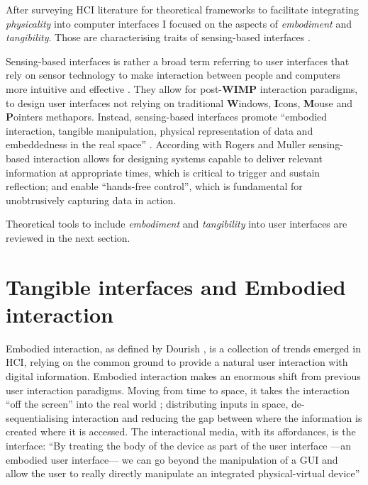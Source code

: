 After surveying HCI literature for theoretical frameworks to facilitate integrating \emph{physicality} into computer interfaces I focused on the aspects of \emph{embodiment} and \emph{tangibility}. Those are characterising traits of sensing-based interfaces \autocite{Benford:2005bo}.

Sensing-based interfaces is rather a broad term referring to user interfaces that rely on sensor technology to make interaction between people and computers more intuitive and effective \autocite{Zhai:2005jm}. They allow for post-\textbf{WIMP} \autocite{VanDam:1997tz} interaction paradigms, to design user interfaces not relying on traditional \textbf{W}indows, \textbf{I}cons, \textbf{M}ouse and \textbf{P}ointers methapors. Instead, sensing-based interfaces promote ``embodied interaction, tangible manipulation, physical representation of data and embeddedness in the real space'' \autocite{Hornecker:2006uq}. According with Rogers and Muller \autocite*{Rogers:2006te} sensing-based interaction allows for designing systems capable to deliver relevant information at appropriate times, which is critical to trigger and sustain reflection; and enable ``hands-free control'', which is fundamental for unobtrusively capturing data in action.

Theoretical tools to include \emph{embodiment} and \emph{tangibility} into user interfaces are reviewed in the next section.

\section{Tangible interfaces and Embodied interaction}\label{tangible-interfaces-and-embodied-interaction}

Embodied interaction, as defined by Dourish \autocite{Dourish:2001vc}, is a collection of trends emerged in HCI, relying on the common ground to provide a natural user interaction with digital information. Embodied interaction makes an enormous shift from previous user interaction paradigms. Moving from time to space, it takes the interaction ``off the screen'' into the real world \autocite{Dourish:2001vc}; distributing inputs in space, de-sequentialising interaction and reducing the gap between where the information is created where it is accessed. The interactional media, with its affordances, is the interface: ``By treating the body of the device as part of the user interface ---an embodied user interface--- we can go beyond the manipulation of a GUI and allow the user to really directly manipulate an integrated physical-virtual device'' \autocite{Fishkin:2000df}


